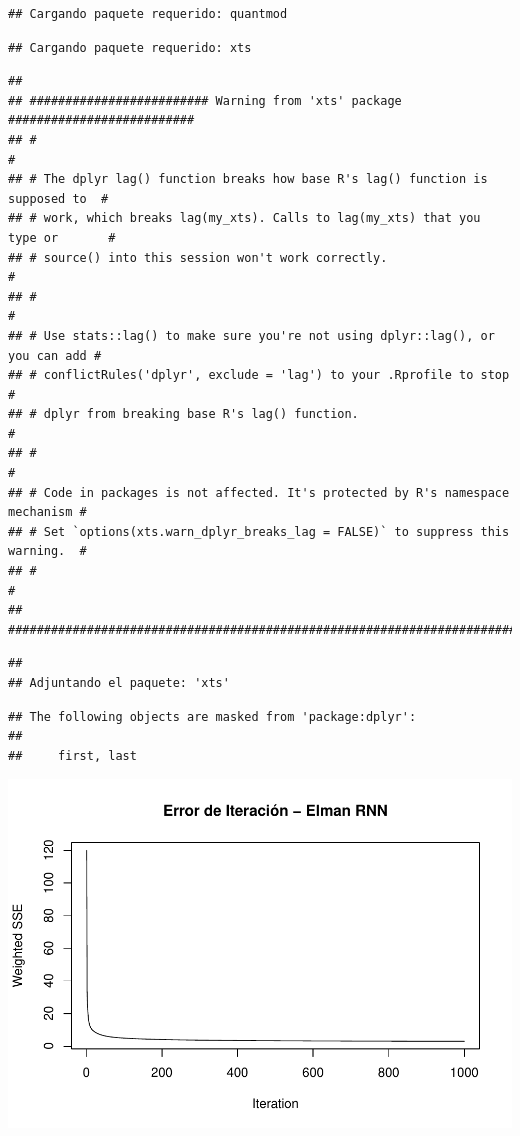 \documentclass[
]{book}
\begin{document}
\begin{verbatim}
## Cargando paquete requerido: quantmod
\end{verbatim}

\begin{verbatim}
## Cargando paquete requerido: xts
\end{verbatim}

\begin{verbatim}
## 
## ######################### Warning from 'xts' package ##########################
## #                                                                             #
## # The dplyr lag() function breaks how base R's lag() function is supposed to  #
## # work, which breaks lag(my_xts). Calls to lag(my_xts) that you type or       #
## # source() into this session won't work correctly.                            #
## #                                                                             #
## # Use stats::lag() to make sure you're not using dplyr::lag(), or you can add #
## # conflictRules('dplyr', exclude = 'lag') to your .Rprofile to stop           #
## # dplyr from breaking base R's lag() function.                                #
## #                                                                             #
## # Code in packages is not affected. It's protected by R's namespace mechanism #
## # Set `options(xts.warn_dplyr_breaks_lag = FALSE)` to suppress this warning.  #
## #                                                                             #
## ###############################################################################
\end{verbatim}

\begin{verbatim}
## 
## Adjuntando el paquete: 'xts'
\end{verbatim}

\begin{verbatim}
## The following objects are masked from 'package:dplyr':
## 
##     first, last
\end{verbatim}

\includegraphics{bookdown_time_series_files/figure-latex/rnn-3-1.pdf}
\end{document}
